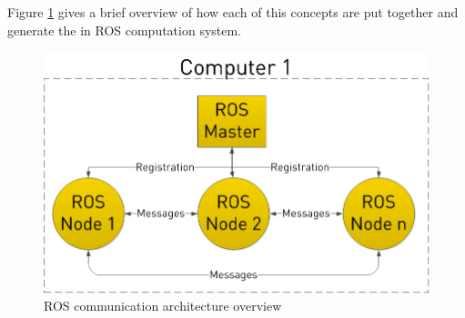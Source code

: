 
Figure \ref{fig:rosgraph} gives a brief overview of how each of this concepts are put together and  generate the in ROS  computation system.

\begin{figure}[h] 
\centerline{\includegraphics [width=0.5 \textwidth]{imgs/chapter2/rosgraph.png}}
\caption{ROS communication architecture overview \cite{rosbasics}}
\label{fig:rosgraph}
\end{figure}


